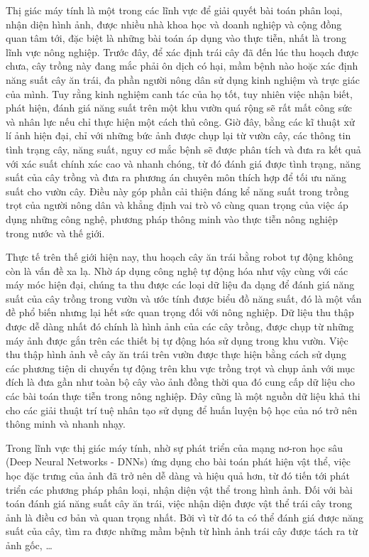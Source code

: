 Thị giác máy tính là một trong các lĩnh vực để giải quyết bài toán phân loại, nhận diện hình ảnh, được nhiều nhà khoa học và doanh nghiệp và cộng đồng quan tâm tới, đặc biệt là những bài toán áp dụng vào thực tiễn, nhất là trong lĩnh vực nông nghiệp. Trước đây, để xác định trái cây đã đến lúc thu hoạch được chưa, cây trồng này đang mắc phải ôn dịch có hại, mầm bệnh nào hoặc xác định năng suất cây ăn trái, đa phần người nông dân sử dụng kinh nghiệm và trực giác của mình. Tuy rằng kinh nghiệm canh tác của họ tốt, tuy nhiên việc nhận biết, phát hiện, đánh giá năng suất trên một khu vườn quá rộng sẽ rất mất công sức và nhân lực nếu chỉ thực hiện một cách thủ công. Giờ đây, bằng các kĩ thuật xử lí ảnh hiện đại, chỉ với những bức ảnh được chụp lại từ vườn cây, các thông tin tình trạng cây, năng suất, nguy cơ mắc bệnh sẽ được phân tích và đưa ra kết quả với xác suất chính xác cao và nhanh chóng, từ đó đánh giá được tình trạng, năng suất của cây trồng và đưa ra phương án chuyên môn thích hợp để tối ưu năng suất cho vườn cây. Điều này góp phần cải thiện đáng kể năng suất trong trồng trọt của người nông dân và khẳng định vai trò vô cùng quan trọng của việc áp dụng những công nghệ, phương pháp thông minh vào thực tiễn nông nghiệp trong nước và thế giới.

Thực tế trên thế giới hiện nay, thu hoạch cây ăn trái bằng robot tự động không còn là vấn đề xa lạ. Nhờ áp dụng công nghệ tự động hóa như vậy cùng với các máy móc hiện đại, chúng ta thu được các loại dữ liệu đa dạng để đánh giá năng suất của cây trồng trong vườn và ước tính được biểu đồ năng suất, đó là một vấn đề phổ biến nhưng lại hết sức quan trọng đối với nông nghiệp. Dữ liệu thu thập được dễ dàng nhất đó chính là hình ảnh của các cây trồng, được chụp từ những máy ảnh được gắn trên các thiết bị tự động hóa sử dụng trong khu vườn. Việc thu thập hình ảnh về cây ăn trái trên vườn được thực hiện bằng cách sử dụng các phương tiện di chuyển tự động trên khu vực trồng trọt và chụp ảnh với mục đích là đưa gần như toàn bộ cây vào ảnh đồng thời qua đó cung cấp dữ liệu cho các bài toán thực tiễn trong nông nghiệp. Đây cũng là một nguồn dữ liệu khả thi cho các giải thuật trí tuệ nhân tạo sử dụng để huấn luyện bộ học của nó trở nên thông minh và nhanh nhạy.

Trong lĩnh vực thị giác máy tính, nhờ sự phát triển của mạng nơ-ron học sâu (Deep Neural Networks - DNNs) ứng dụng cho bài toán phát hiện vật thể, việc học đặc trưng của ảnh đã trở nên dễ dàng và hiệu quả hơn, từ đó tiến tới phát triển các phương pháp phân loại, nhận diện vật thể trong hình ảnh. Đối với bài toán đánh giá năng suất cây ăn trái, việc nhận diện được vật thể trái cây trong ảnh là điều cơ bản và quan trọng nhất. Bởi vì từ đó ta có thể đánh giá được năng suất của cây, tìm ra được những mầm bệnh từ hình ảnh trái cây được tách ra từ ảnh gốc, …

